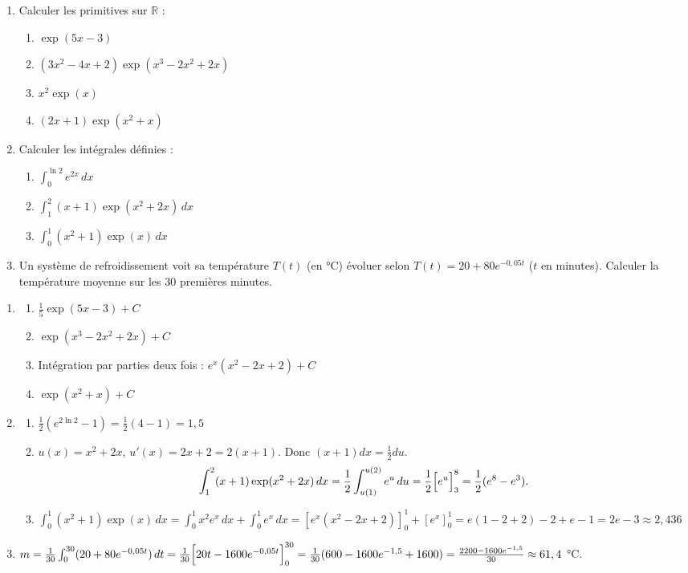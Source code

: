 \documentclass[11pt]{article}
\begin{document}
\begin{exercice}
\begin{enumerate}
\item Calculer les primitives sur $\mathbb{R}$ :
      \begin{enumerate}
      \item $\exp(5x-3)$
      \item $(3x^2-4x+2)\exp(x^3-2x^2+2x)$
      \item $x^2\exp(x)$
      \item $(2x+1)\exp(x^2+x)$
      \end{enumerate}
\item Calculer les intégrales définies :
      \begin{enumerate}
      \item $\int_0^{\ln 2} e^{2x}\,dx$
      \item $\int_1^2 (x+1)\exp(x^2+2x)\,dx$
      \item $\int_0^1 (x^2+1)\exp(x)\,dx$
      \end{enumerate}
\item Un système de refroidissement voit sa température $T(t)$ (en °C) évoluer selon $T(t)=20+80e^{-0,05t}$ ($t$ en minutes). Calculer la température moyenne sur les $30$ premières minutes.
\end{enumerate}
\end{exercice}

\begin{corrige}[Exercice n]
\begin{enumerate}
\item \begin{enumerate}
      \item $\frac{1}{5}\exp(5x-3)+C$
      \item $\exp(x^3-2x^2+2x)+C$
      \item Intégration par parties deux fois : $e^x(x^2-2x+2)+C$
      \item $\exp(x^2+x)+C$
      \end{enumerate}
\item \begin{enumerate}
      \item $\frac{1}{2}(e^{2\ln 2}-1)=\frac{1}{2}(4-1)=1,5$
      \item $u(x)=x^2+2x$, $u'(x)=2x+2=2(x+1)$. Donc $(x+1)dx = \frac{1}{2}du$.
            \[
            \int_1^2 (x+1)\exp(x^2+2x)\,dx = \frac{1}{2}\int_{u(1)}^{u(2)} e^u\,du = \frac{1}{2}\Bigl[e^u\Bigr]_3^8 = \frac{1}{2}(e^8-e^3).
            \]
      \item $\int_0^1 (x^2+1)\exp(x)\,dx = \int_0^1 x^2 e^x\,dx + \int_0^1 e^x\,dx = [e^x(x^2-2x+2)]_0^1 + [e^x]_0^1 = e(1-2+2)-2 + e-1 = 2e-3 \approx 2,436$
      \end{enumerate}
\item $m = \frac{1}{30}\int_0^{30}(20+80e^{-0,05t})\,dt = \frac{1}{30}\Bigl[20t - 1600e^{-0,05t}\Bigr]_0^{30} = \frac{1}{30}(600 - 1600e^{-1,5} + 1600) = \frac{2200 - 1600e^{-1,5}}{30} \approx 61,4$ °C.
\end{enumerate}
\end{corrige}
\end{document}

